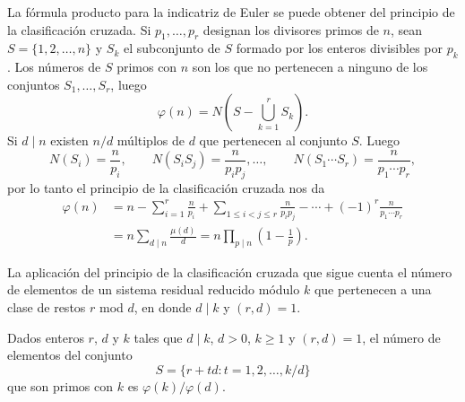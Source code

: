 \documentclass[12pt,a4paper]{book}
\begin{document}
    \begin{ejemplo}
        La fórmula producto para la indicatriz de Euler se puede obtener del principio de
        la clasificación cruzada. Si $p_{1},\dots,p_{r}$ designan los divisores primos de $n$,
        sean $S=\{1,2,\dots,n\}$ y $S_{k}$ el subconjunto de $S$ formado por los enteros
        divisibles por $p_{k}$. Los números de $S$ primos con $n$ son los que no pertenecen
        a ninguno de los conjuntos $S_{1},\dots,S_{r}$, luego
        \begin{equation*}
            \varphi(n)=N\left(S-\bigcup_{k=1}^{r}S_{k}\right).
        \end{equation*}
        Si $d\mid n$ existen $n/d$ múltiplos de $d$ que pertenecen al conjunto $S$. Luego
        \begin{equation*}
            N(S_{i})=\frac{n}{p_{i}},\qquad N(S_{i}S_{j})=\frac{n}{p_{i}p_{j}},\dots,\qquad
            N(S_{1}\cdots S_{r})=\frac{n}{p_{1}\cdots p_{r}},
        \end{equation*}
        por lo tanto el principio de la clasificación cruzada nos da
        \begin{align*}
            \varphi(n)&=n-\sum_{i=1}^{r}\frac{n}{p_{i}}+\sum_{1\leq i<j\leq r}\frac{n}{p_{i}p_{j}}
            -\cdots+(-1)^{r}\frac{n}{p_{1}\cdots p_{r}}\\
            &=n\sum_{d\mid n}\frac{\mu(d)}{d}=n\prod_{p\mid n}\left(1-\frac{1}{p}\right).
        \end{align*}
    \end{ejemplo}

    La aplicación del principio de la clasificación cruzada que sigue cuenta el número de
    elementos de un sistema residual reducido módulo $k$ que pertenecen a una clase de
    restos $r$ mod $d$, en donde $d\mid k$ y $(r,d)=1$.

    \begin{teorema}
        Dados enteros $r$, $d$ y $k$ tales que $d\mid k$, $d>0$, $k\geq1$ y $(r,d)=1$, el
        número de elementos del conjunto
        \begin{equation*}
            S=\{r+td:t=1,2,\dots,k/d\}
        \end{equation*}
        que son primos con $k$ es $\varphi(k)/\varphi(d)$.
    \end{teorema}
\end{document}
